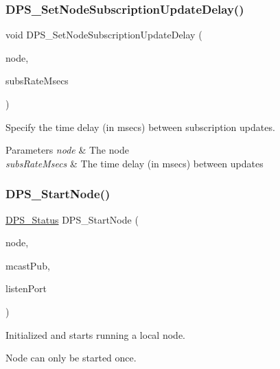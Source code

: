 \subsubsection{\texorpdfstring{D\+P\+S\+\_\+\+Set\+Node\+Subscription\+Update\+Delay()}{DPS\_SetNodeSubscriptionUpdateDelay()}}
{\footnotesize\ttfamily void D\+P\+S\+\_\+\+Set\+Node\+Subscription\+Update\+Delay (\begin{DoxyParamCaption}\item[{\hyperlink{group__node_ga4dd612ab965134321bb57fdb065f121c}{D\+P\+S\+\_\+\+Node} $\ast$}]{node,  }\item[{uint32\+\_\+t}]{subs\+Rate\+Msecs }\end{DoxyParamCaption})}



Specify the time delay (in msecs) between subscription updates. 


\begin{DoxyParams}{Parameters}
{\em node} & The node \\
\hline
{\em subs\+Rate\+Msecs} & The time delay (in msecs) between updates \\
\hline
\end{DoxyParams}
\mbox{\label{group__node_ga160d504bfaeb0d3711e0259000340fe3}} 
\subsubsection{\texorpdfstring{D\+P\+S\+\_\+\+Start\+Node()}{DPS\_StartNode()}}
{\footnotesize\ttfamily \hyperlink{group__status_ga30395a84d3cad9d4ec29848106415038}{D\+P\+S\+\_\+\+Status} D\+P\+S\+\_\+\+Start\+Node (\begin{DoxyParamCaption}\item[{\hyperlink{group__node_ga4dd612ab965134321bb57fdb065f121c}{D\+P\+S\+\_\+\+Node} $\ast$}]{node,  }\item[{int}]{mcast\+Pub,  }\item[{uint16\+\_\+t}]{listen\+Port }\end{DoxyParamCaption})}



Initialized and starts running a local node. 

Node can only be started once.


